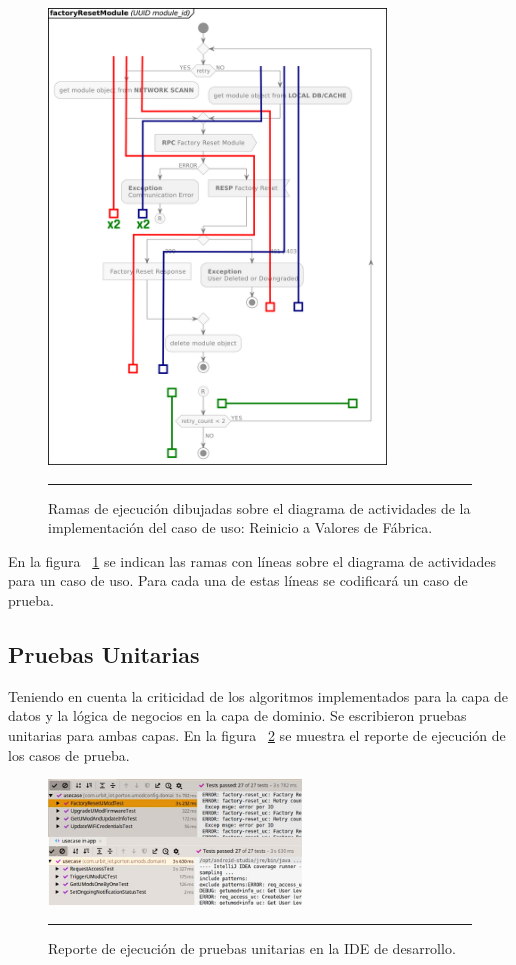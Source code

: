 \begin{figure}[htbp]
	\centering
	\includegraphics[width=0.8\textwidth]{Figures/iter2/ACT_factoryResetModule_branches_ink.png}
	\rule{35em}{1pt}
	\caption[Class Diagram]{Ramas de ejecución dibujadas sobre el diagrama de actividades de la implementación del caso de uso: Reinicio a Valores de Fábrica.}
	\label{fig:act_act_test_branches}
\end{figure}

En la figura ~\ref{fig:act_act_test_branches} se indican las ramas con líneas sobre el diagrama de actividades para un caso de uso. Para cada una de estas líneas se codificará un caso de prueba.

\subsection{Pruebas Unitarias}
Teniendo en cuenta la criticidad de los algoritmos implementados para la capa de datos y la lógica de negocios en la capa de dominio. Se escribieron pruebas unitarias para ambas capas. En la figura ~\ref{fig:tests_ss} se muestra el reporte de ejecución de los casos de prueba. 

\begin{figure}[H]
	\centering
	\includegraphics[width=0.6\textwidth]{Figures/iter2/tests_all.png}
	\rule{35em}{1pt}
	\caption[Screenshot]{Reporte de ejecución de pruebas unitarias en la IDE de desarrollo.}
	\label{fig:tests_ss}
\end{figure}

